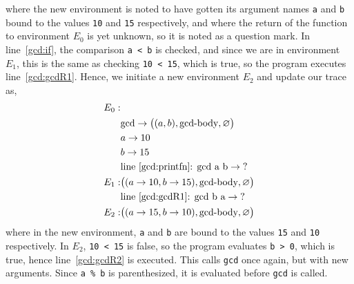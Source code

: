 \documentclass[fsharpnotes.tex]{subfiles}
\begin{document}
where the new environment is noted to have gotten its argument names \lstinline!a! and \lstinline!b! bound to the values \lstinline!10! and \lstinline!15! respectively, and where the return of the function to environment $E_0$ is yet unknown, so it is noted as a question mark. In line~\ref{gcd:if}, the comparison \lstinline!a < b! is checked, and since we are in environment $E_1$, this is the same as checking \lstinline!10 < 15!, which is true, so the program executes line~\ref{gcd:gcdR1}. Hence, we initiate a new environment $E_2$ and update our trace as,
\begin{align*}
  E_0:&\\
      & \text{gcd} \rightarrow \big((a, b), \text{gcd-body}, \varnothing\big)\\
      & a \rightarrow 10\\
      & b \rightarrow 15\\
      & \text{line~\ref{gcd:printfn}: gcd a b} \rightarrow \text{?}\\
  E_1:& \big((a \rightarrow 10, b \rightarrow 15), \text{gcd-body}, \varnothing\big)\\
      & \text{line~\ref{gcd:gcdR1}: gcd b a} \rightarrow \text{?}\\
  E_2:& \big((a \rightarrow 15, b \rightarrow 10), \text{gcd-body}, \varnothing\big)\\
\end{align*}
where in the new environment, \lstinline!a! and \lstinline!b! are bound to the values \lstinline!15! and \lstinline!10! respectively. In $E_2$, \lstinline!10 < 15! is false, so the program evaluates \lstinline!b > 0!, which is true, hence line~\ref{gcd:gcdR2} is executed. This calls \lstinline!gcd! once again, but with new arguments. Since \lstinline{a % b} is parenthesized, it is evaluated before \lstinline!gcd! is called. 
\end{document}
